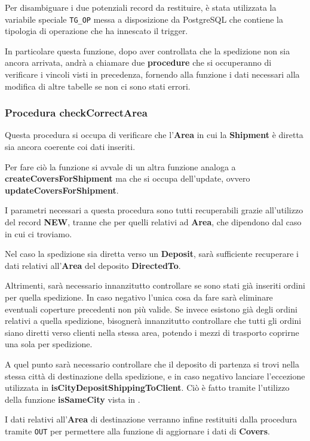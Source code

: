 Per disambiguare i due potenziali record da restituire, è stata utilizzata la variabile speciale \lstinline{TG_OP} messa a disposizione da PostgreSQL che contiene la tipologia di operazione che ha innescato il trigger.

In particolare questa funzione, dopo aver controllata che la spedizione non sia ancora arrivata, andrà a chiamare due \textbf{procedure} che si occuperanno di verificare i vincoli visti in precedenza, fornendo alla funzione i dati necessari alla modifica di altre tabelle se non ci sono stati errori.
\subsubsection{Procedura \textbf{checkCorrectArea}}

Questa procedura si occupa di verificare che l'\textbf{Area} in cui la \textbf{Shipment} è diretta sia ancora coerente coi dati inseriti.

Per fare ciò la funzione si avvale di un altra funzione analoga a \textbf{createCoversForShipment} ma che si occupa dell'update, ovvero \textbf{updateCoversForShipment}.

I parametri necessari a questa procedura sono tutti recuperabili grazie all'utilizzo del record \textbf{NEW}, tranne che per quelli relativi ad \textbf{Area}, che dipendono dal caso in cui ci troviamo.

Nel caso la spedizione sia diretta verso un \textbf{Deposit}, sarà sufficiente recuperare i dati relativi all'\textbf{Area} del deposito \textbf{DirectedTo}.

Altrimenti, sarà necessario innanzitutto controllare se sono stati già inseriti ordini per quella spedizione. In caso negativo l'unica cosa da fare sarà eliminare eventuali coperture precedenti non più valide.
Se invece esistono già degli ordini relativi a quella spedizione, bisognerà innanzitutto controllare che tutti gli ordini siano diretti verso clienti nella stessa area, potendo i mezzi di trasporto coprirne una sola per spedizione.

A quel punto sarà necessario controllare che il deposito di partenza si trovi nella stessa città di destinazione della spedizione, e in caso negativo lanciare l'eccezione utilizzata in \textbf{isCityDepositShippingToClient}.
Ciò è fatto tramite l'utilizzo della funzione \textbf{isSameCity} vista in .

I dati relativi all'\textbf{Area} di destinazione verranno infine restituiti dalla procedura tramite \lstinline{OUT} per permettere alla funzione di aggiornare i dati di \textbf{Covers}.


